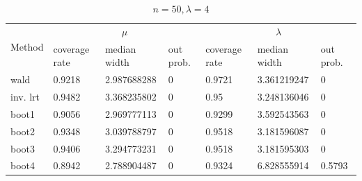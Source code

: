 \documentclass{article}
\begin{document}
\begin{table}
        \begin{subtable}[b]{\textwidth}
		\centering
		\begin{tabular}{l|lll|lll}
		\toprule
        \multirow{2}{*}{Method} & \multicolumn{3}{c|}{$\mu$}      & \multicolumn{3}{c}{$\lambda$}  \\ 
                           & coverage rate & median width & out prob. & coverage rate & median width & out prob. \\
                           \midrule
wald      & 0.9218	&2.987688288	&0 & 0.9721	&3.361219247	&0     \\
inv. lrt  & 0.9482	&3.368235802	&0 & 0.95	&3.248136046	&0     \\
boot1     & 0.9056	&2.969777113	&0 & 0.9299	&3.592543563	&0     \\
boot2     & 0.9348	&3.039788797	&0 & 0.9518	&3.181596087	&0     \\
boot3     & 0.9406	&3.294773231	&0 & 0.9518	&3.181595303	&0     \\
boot4     & 0.8942	&2.788904487	&0 & 0.9324	&6.828555914	&0.5793\\
       \bottomrule
       \end{tabular}
       \caption{$n = 50, \lambda = 4$}
       \label{50_4}
       \end{subtable}%
       \end{table}
\end{document}
